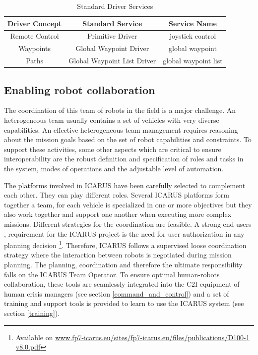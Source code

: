 \documentclass{article}
\begin{document}
\begin{table}[h!]
\centering
\begin{tabular}{| c | c | c |}
\hline
Driver Concept & Standard Service & Service Name \\ \hline
Remote Control          & Primitive Driver            & joystick control     \\ \hline
Waypoints 		        & Global Waypoint Driver      & global waypoint      \\ \hline
Paths	 		        & Global Waypoint List Driver & global waypoint list \\ \hline
\end{tabular}
\caption{Standard Driver Services}
\label{table:driverservices}
\end{table}

\subsection{Enabling robot collaboration}
The coordination of this team of robots in the field is a major challenge. An heterogeneous team usually contains a set of vehicles with very diverse capabilities. An effective heterogeneous team management requires reasoning about the mission goals based on the set of robot capabilities and constraints. To support these activities, some other aspects which are critical to ensure interoperability are the robust definition and specification of roles and tasks in the system, modes of operations and the adjustable level of automation.

The platforms involved in ICARUS have been carefully selected to complement each other. They can play different roles. Several ICARUS platforms form together a team, for each vehicle is specialized in one or more objectives but they also work together and support one another when executing more complex missions. Different strategies for the coordination are feasible. A strong end-users  \cite{b-fast}, requirement for the ICARUS project is the need for user authorization in any planning decision \footnote{Available on \url{www.fp7-icarus.eu/sites/fp7-icarus.eu/files/publications/D100-1 v8.0.pdf}}. Therefore, ICARUS follows a supervised loose coordination strategy where the interaction between robots is negotiated during mission planning. The planning, coordination and therefore the ultimate responsibility falls on the ICARUS Team Operator. To ensure optimal human-robots collaboration, these tools are seamlessly integrated into the C2I equipment of human crisis managers (see section \ref{command_and_control}) and a set of training and support tools is provided to learn to use the ICARUS system (see section \ref{training}).
\end{document}
